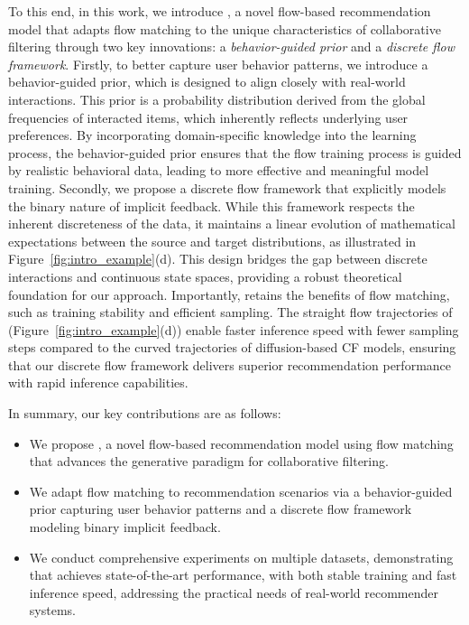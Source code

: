 \documentclass[sigconf]{acmart}
\begin{document}
To this end, in this work, we introduce \textbf{\ours}, a novel flow-based recommendation model that adapts flow matching to the unique characteristics of collaborative filtering through two key innovations: a \textit{behavior-guided prior} and a \textit{discrete flow framework}. 
Firstly, to better capture user behavior patterns, we introduce a behavior-guided prior, which is designed to align closely with real-world interactions. 
This prior is a probability distribution derived from the global frequencies of interacted items, which inherently reflects underlying user preferences. 
By incorporating domain-specific knowledge into the learning process, the behavior-guided prior ensures that the flow training process is guided by realistic behavioral data, leading to more effective and meaningful model training.
Secondly, we propose a discrete flow framework that explicitly models the binary nature of implicit feedback.
While this framework respects the inherent discreteness of the data, it maintains a linear evolution of mathematical expectations between the source and target distributions, as illustrated in Figure~\ref{fig:intro_example}(d). 
This design bridges the gap between discrete interactions and continuous state spaces, providing a robust theoretical foundation for our approach. Importantly, \ours retains the benefits of flow matching, such as training stability and efficient sampling. The straight flow trajectories of \ours (Figure~\ref{fig:intro_example}(d)) enable faster inference speed with fewer sampling steps compared to the curved trajectories of diffusion-based CF models, ensuring that our discrete flow framework delivers superior recommendation performance with rapid inference capabilities.

In summary, our key contributions are as follows:
\begin{itemize}
[leftmargin=*,noitemsep,topsep=1.5pt]
    \item We propose \ours, a novel flow-based recommendation model using flow matching that advances the generative paradigm for collaborative filtering.
    \item We adapt flow matching to recommendation scenarios via a behavior-guided prior capturing user behavior patterns and a discrete flow framework modeling binary implicit feedback.
    \item We conduct comprehensive experiments on multiple datasets, demonstrating that \ours achieves state-of-the-art performance, with both stable training and fast inference speed, addressing the practical needs of real-world recommender systems.
\end{itemize}
\end{document}
